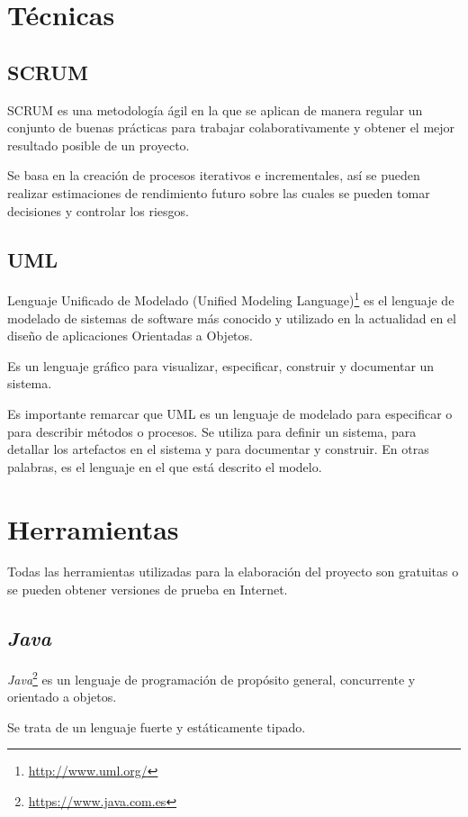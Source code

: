 
\section{Técnicas}

\subsection{SCRUM}
SCRUM\cite{scrum} es una metodología ágil en la que se aplican de manera regular un conjunto de buenas prácticas para trabajar colaborativamente y obtener el mejor resultado posible de un proyecto.

Se basa en la creación de procesos iterativos e incrementales, así se pueden realizar estimaciones de rendimiento futuro sobre las cuales se pueden tomar decisiones y controlar los riesgos.
\subsection{UML\cite{UML}}
Lenguaje Unificado de Modelado (Unified Modeling Language)\footnote{\url{http://www.uml.org/}} es el lenguaje de modelado de sistemas de software más conocido y utilizado en la actualidad en el diseño de aplicaciones Orientadas a Objetos.

Es un lenguaje gráfico para visualizar, especificar, construir y documentar un sistema.

Es importante remarcar que UML es un lenguaje de modelado para especificar o para describir métodos o procesos. Se utiliza para definir un sistema, para detallar los artefactos en el sistema y para documentar y construir. En otras palabras, es el lenguaje en el que está descrito el modelo.
\section{Herramientas}

Todas las herramientas utilizadas para la elaboración del proyecto son gratuitas o se pueden obtener versiones de prueba en Internet.

\subsection{\textit{Java}}
\textit{Java}\footnote{\url{https://www.java.com.es}} es un lenguaje de programación de propósito general, concurrente y orientado a objetos.

Se trata de un lenguaje fuerte y estáticamente tipado.

